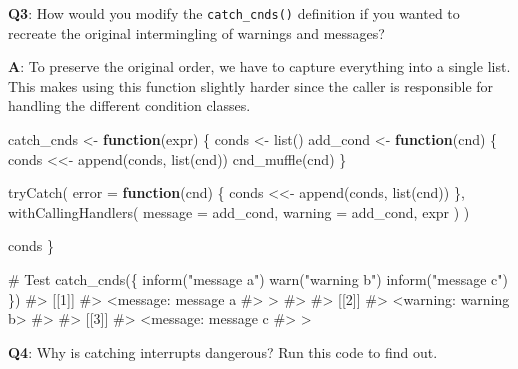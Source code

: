 \documentclass[
]{krantz}
\makeatletter
\newenvironment{Shaded}{\begin{snugshade}}{\end{snugshade}}
\newcommand{\CommentTok}[1]{\textcolor[rgb]{0.56,0.35,0.01}{\textit{#1}}}
\newcommand{\ControlFlowTok}[1]{\textcolor[rgb]{0.13,0.29,0.53}{\textbf{#1}}}
\newcommand{\DataTypeTok}[1]{\textcolor[rgb]{0.13,0.29,0.53}{#1}}
\newcommand{\KeywordTok}[1]{\textcolor[rgb]{0.13,0.29,0.53}{\textbf{#1}}}
\newcommand{\NormalTok}[1]{#1}
\newcommand{\StringTok}[1]{\textcolor[rgb]{0.31,0.60,0.02}{#1}}
\newenvironment{kframe}{%
\medskip{}
\setlength{\fboxsep}{.8em}
 \def\at@end@of@kframe{}%
 \ifinner\ifhmode%
  \def\at@end@of@kframe{\end{minipage}}%
  \begin{minipage}{\columnwidth}%
 \fi\fi%
 \def\FrameCommand##1{\hskip\@totalleftmargin \hskip-\fboxsep
 \colorbox{shadecolor}{##1}\hskip-\fboxsep
     \hskip-\linewidth \hskip-\@totalleftmargin \hskip\columnwidth}%
 \MakeFramed {\advance\hsize-\width
   \@totalleftmargin\z@ \linewidth\hsize
   \@setminipage}}%
 {\par\unskip\endMakeFramed%
 \at@end@of@kframe}
\renewenvironment{Shaded}{\begin{kframe}}{\end{kframe}}
\renewcommand{\KeywordTok} [1]{\textcolor[rgb]{0.00,0.44,0.13}{{#1}}}
\renewcommand{\DataTypeTok}[1]{\textcolor[rgb]{0.56,0.13,0.00}{{#1}}}
\renewcommand{\StringTok}  [1]{\textcolor[rgb]{0.25,0.44,0.63}{{#1}}}
\renewcommand{\CommentTok} [1]{\textcolor[rgb]{0.38,0.63,0.69}{{#1}}}
\renewcommand{\NormalTok}  [1]{{#1}}
\makeatother
\begin{document}
\textbf{{Q3}}: How would you modify the \texttt{catch\_cnds()} definition if you wanted to recreate the original intermingling of warnings and messages?

\textbf{{A}}: To preserve the original order, we have to capture everything into a single list. This makes using this function slightly harder since the caller is responsible for handling the different condition classes.

\begin{Shaded}
\begin{Highlighting}[]
\NormalTok{catch_cnds <-}\StringTok{ }\ControlFlowTok{function}\NormalTok{(expr) \{}
\NormalTok{  conds <-}\StringTok{ }\KeywordTok{list}\NormalTok{()}
\NormalTok{  add_cond <-}\StringTok{ }\ControlFlowTok{function}\NormalTok{(cnd) \{}
\NormalTok{    conds <<-}\StringTok{ }\KeywordTok{append}\NormalTok{(conds, }\KeywordTok{list}\NormalTok{(cnd))}
    \KeywordTok{cnd_muffle}\NormalTok{(cnd)}
\NormalTok{  \}}
  
  \KeywordTok{tryCatch}\NormalTok{(}
    \DataTypeTok{error =} \ControlFlowTok{function}\NormalTok{(cnd) \{}
\NormalTok{      conds <<-}\StringTok{ }\KeywordTok{append}\NormalTok{(conds, }\KeywordTok{list}\NormalTok{(cnd))}
\NormalTok{    \},}
    \KeywordTok{withCallingHandlers}\NormalTok{(}
      \DataTypeTok{message =}\NormalTok{ add_cond,}
      \DataTypeTok{warning =}\NormalTok{ add_cond,}
\NormalTok{      expr}
\NormalTok{    )}
\NormalTok{  )}
  
\NormalTok{  conds}
\NormalTok{\}}

\CommentTok{# Test}
\KeywordTok{catch_cnds}\NormalTok{(\{}
  \KeywordTok{inform}\NormalTok{(}\StringTok{"message a"}\NormalTok{)}
  \KeywordTok{warn}\NormalTok{(}\StringTok{"warning b"}\NormalTok{)}
  \KeywordTok{inform}\NormalTok{(}\StringTok{"message c"}\NormalTok{)}
\NormalTok{\})}
\CommentTok{#> [[1]]}
\CommentTok{#> <message: message a}
\CommentTok{#> >}
\CommentTok{#> }
\CommentTok{#> [[2]]}
\CommentTok{#> <warning: warning b>}
\CommentTok{#> }
\CommentTok{#> [[3]]}
\CommentTok{#> <message: message c}
\CommentTok{#> >}
\end{Highlighting}
\end{Shaded}

\textbf{{Q4}}: Why is catching interrupts dangerous? Run this code to find out.
\end{document}
